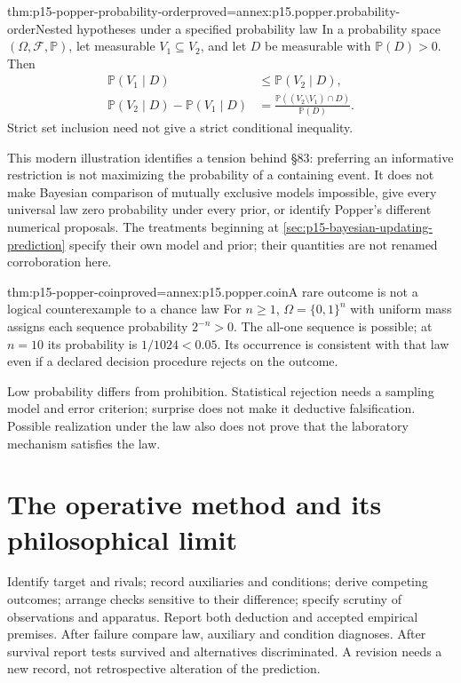 \begin{hbtheorem}{thm:p15-popper-probability-order}{proved=annex:p15.popper.probability-order}{Nested hypotheses under a specified probability law}
In a probability space \((\Omega,\mathcal F,\mathbb P)\), let measurable
\(V_1\subseteq V_2\), and let \(D\) be measurable with
\(\mathbb P(D)>0\). Then
\[
\begin{aligned}
\mathbb P(V_1\mid D)&\leq\mathbb P(V_2\mid D),\\
\mathbb P(V_2\mid D)-\mathbb P(V_1\mid D)
&=\frac{\mathbb P((V_2\setminus V_1)\cap D)}{\mathbb P(D)}.
\end{aligned}
\]
Strict set inclusion need not give a strict conditional inequality.
\end{hbtheorem}

This modern illustration identifies a tension behind \S83:
preferring an informative restriction is not maximizing the probability
of a containing event. It does not make Bayesian comparison of
mutually exclusive models impossible, give every universal law zero
probability under every prior, or identify Popper's different
numerical proposals. The treatments beginning at
\cref{sec:p15-bayesian-updating-prediction} specify their own model
and prior; their quantities are not renamed corroboration here.

\begin{hbtheorem}{thm:p15-popper-coin}{proved=annex:p15.popper.coin}{A rare outcome is not a logical counterexample to a chance law}
For \(n\geq1\), \(\Omega=\{0,1\}^n\) with uniform mass assigns
each sequence probability \(2^{-n}>0\). The all-one sequence is
possible; at \(n=10\) its probability is \(1/1024<0.05\).
Its occurrence is consistent with that law even if a declared
decision procedure rejects on the outcome.
\end{hbtheorem}

Low probability differs from prohibition. Statistical rejection
needs a sampling model and error criterion; surprise does not make
it deductive falsification. Possible realization under the law also
does not prove that the laboratory mechanism satisfies the law.

\section{The operative method and its philosophical limit}
\label{sec:p15-popper-method}

Identify target and rivals; record auxiliaries and conditions;
derive competing outcomes; arrange checks sensitive to their
difference; specify scrutiny of observations and apparatus.
Report both deduction and accepted empirical premises.
After failure compare law, auxiliary and condition diagnoses.
After survival report tests survived and alternatives discriminated.
A revision needs a new record, not retrospective alteration
of the prediction.

